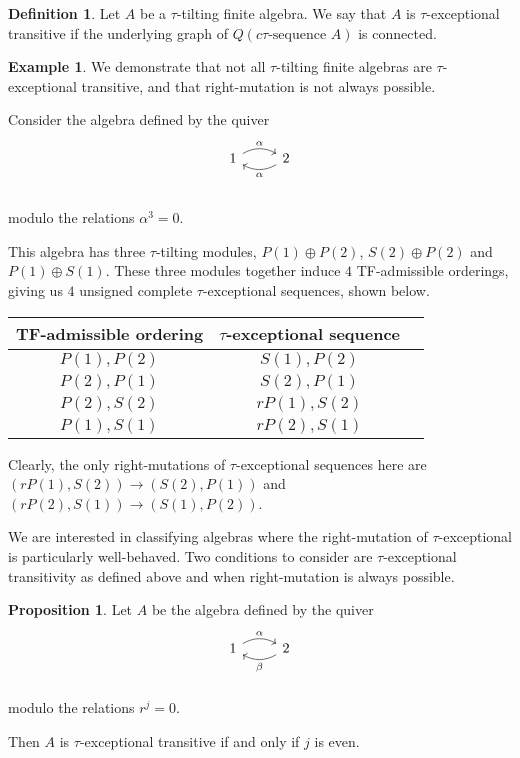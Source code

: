 \documentclass[]{article}
\theoremstyle{definition}
\newtheorem{definition}{Definition}[section]
\newtheorem{proposition}{Proposition}[section]
\newtheorem{example}{Example}[section]
\newcommand{\tu}{\ensuremath{\tau}}
\begin{document}
\begin{definition}
	Let $A$ be a \tu-tilting finite algebra. We say that $A$ is \tu-exceptional transitive if the underlying graph of $Q(c\tu \text{-sequence } A)$ is connected.
\end{definition}



\begin{example}
	We demonstrate that not all \tu-tilting finite algebras are \tu-exceptional transitive, and that right-mutation is not always possible.
	
	Consider the algebra defined by the quiver
	\[
	\begin{tikzcd}
	1 \arrow[r,bend left,"\alpha"] & 2 \arrow[l,bend left,"\alpha"]  \\
	\end{tikzcd}
	\]
	
	modulo the relations $\alpha^3 = 0$.
	
	This algebra has three $\tau$-tilting modules, $P(1) \oplus P(2)$, $S(2) \oplus P(2)$ and $P(1) \oplus S(1)$. These three modules together induce $4$ TF-admissible orderings, giving us $4$ unsigned complete \tu-exceptional sequences, shown below.
	
	\begin{center}
		\begin{tabular}{ |c|c|c| } 
			\hline
			TF-admissible ordering & $\tau$-exceptional sequence \\
			\hline
			$P(1),P(2)$ & $S(1),P(2)$ \\ 
			$P(2),P(1)$ & $S(2),P(1)$ \\ 
			$P(2),S(2)$ & $rP(1),S(2)$\\ 
			$P(1),S(1)$ & $rP(2),S(1)$ \\
			\hline
		\end{tabular}
	\end{center}

	
	
	Clearly, the only right-mutations of $\tau$-exceptional sequences here are $(rP(1),S(2)) \to (S(2),P(1))$ and $(rP(2),S(1)) \to (S(1),P(2))$. 
\end{example}

We are interested in classifying algebras where the right-mutation of \tu-exceptional is particularly well-behaved. Two conditions to consider are \tu-exceptional transitivity as defined above and when right-mutation is always possible.

\begin{proposition}
	Let $A$ be the algebra defined by the quiver
	\[
	\begin{tikzcd}
	1 \arrow[r,bend left,"\alpha"] & 2 \arrow[l,bend left,"\beta"]  \\
	\end{tikzcd}
	\]
	
	modulo the relations $r^j = 0$.
	
	Then $A$ is \tu-exceptional transitive if and only if $j$ is even.
\end{proposition}
\end{document}
